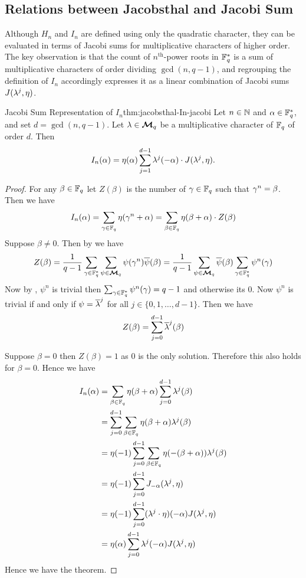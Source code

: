 \subsection{Relations between Jacobsthal and Jacobi Sum}
Although $H_n$ and $I_n$ are defined using only the quadratic character, they can be evaluated in terms of Jacobi sums for multiplicative characters of higher order. The key observation is that the count of $n^{\text{th}}$-power roots in $\mathbb{F}_q^*$ is a sum of multiplicative characters of order dividing $\gcd(n,q-1)$, and regrouping the definition of $I_n$ accordingly expresses it as a linear combination of Jacobi sums $J(\lambda^j,\eta)$.
\begin{Theorem}{Jacobi Sum Representation of $I_n$}{thm:jacobsthal-In-jacobi}
  Let $n\in\mathbb{N}$ and $\alpha\in\mathbb{F}_q^*$, and set $d=\gcd(n,q-1)$. Let $\lambda\in\boldsymbol{\mathcal{M}}_q$ be a multiplicative character of $\mathbb{F}_q$ of order $d$. Then $$I_n(\alpha)=\eta(\alpha)\sum_{j=1}^{d-1}\lambda^j(-\alpha)\cdot J(\lambda^j,\eta).$$
\end{Theorem}
\begin{proof}
  For any $\beta\in\mathbb{F}_q$ let $Z(\beta)$ is the number of $\gamma\in\mathbb{F}_q$ such that $\gamma^n=\beta$. Then we have $$I_n(\alpha)=\sum_{\gamma\in\mathbb{F}_q}\eta(\gamma^n+\alpha)=\sum_{\beta\in\mathbb{F}_q}\eta(\beta+\alpha)\cdot Z(\beta)$$Suppose $\beta\neq 0$. Then by \MultCharPropsthm[(iii)] we have $$Z(\beta)=\frac1{q-1}\sum_{\gamma\in\mathbb{F}_q^*}\sum_{\psi\in\boldsymbol{\mathcal{M}}_q}\psi(\gamma^n)\overline{\psi}(\beta)=\frac1{q-1}\sum_{\psi\in\boldsymbol{\mathcal{M}}_q}\overline{\psi}(\beta)\sum_{\gamma\in\mathbb{F}_q^*}\psi^n(\gamma)$$Now by \MultCharPropsthm[(i)], $\psi^n$ is trivial then $\sum_{\gamma\in\mathbb{F}_q^*}\psi^n(\gamma)=q-1$ and otherwise its $0$. Now $\psi^n$ is trivial if and only if $\psi=\overline{\lambda}^j$ for all $j\in\{0,1,\dots, d-1\}$. Then we have $$Z(\beta)=\sum_{j=0}^{d-1}\overline{\lambda}^j(\beta)$$

  Suppose $\beta=0$ then $Z(\beta)=1$ as $0$ is the only solution. Therefore this also holds for $\beta=0$. Hence we have \begin{align*}
    I_n(\alpha) & = \sum_{\beta\in\mathbb{F}_q}\eta(\beta+\alpha)\sum_{j=0}^{d-1}\lambda^j(\beta)\\ 
    & = \sum_{j=0}^{d-1} \sum_{\beta\in\mathbb{F}_q}\eta(\beta+\alpha)\lambda^j(\beta)\\ 
    & = \eta(-1)\sum_{j=0}^{d-1}\sum_{\beta\in\mathbb{F}_q}\eta(-(\beta+\alpha))\lambda^j(\beta)\\ 
    & = \eta(-1)\sum_{j=0}^{d-1}J_{-\alpha}(\lambda^j,\eta)\\ 
    & = \eta(-1)\sum_{j=0}^{d-1}(\lambda^j\cdot \eta)(-\alpha)J(\lambda^j,\eta)\\ 
    & = \eta(\alpha) \sum_{j=0}^{d-1}\lambda^j(-\alpha)J(\lambda^j,\eta)
  \end{align*}
  Hence we have the theorem. 
\end{proof}

